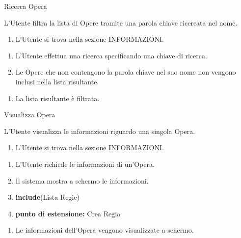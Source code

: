 {\ucExtTable	%
	{	%
		Ricerca Opera
		
	}{	%
		
	}{	%
		L'Utente filtra la lista di Opere tramite una parola chiave ricercata nel nome.
		
	}{	%
		\attori
	}{	%
		\begin{enumerate}
			\item L'Utente si trova nella sezione INFORMAZIONI.
		\end{enumerate}
		
	}{	%
		\begin{enumerate}
			\item L'Utente effettua una ricerca specificando una chiave di ricerca.
            \item Le Opere che non contengono la parola chiave nel suo nome non vengono inclusi nella lista risultante.
		\end{enumerate}
		
	}{	%
		\begin{enumerate}
			\item La lista risultante è filtrata.
		\end{enumerate}
} }


{\ucTable	%
	{	%
		Visualizza Opera
		
	}{	%
		
	}{	%
		L'Utente visualizza le informazioni riguardo una singola Opera.
		
	}{	%
		\attori
	}{	%
		\begin{enumerate}
			\item L'Utente si trova nella sezione INFORMAZIONI.
		\end{enumerate}
		
	}{	%
		\begin{enumerate}
			\item L'Utente richiede le informazioni di un'Opera.
            \item Il sistema mostra a schermo le informazioni.
            \item \textbf{include}(Lista Regie)
            \item[] \textbf{punto di estensione:} Crea Regia
		\end{enumerate}
		
	}{	%
		\begin{enumerate}
			\item Le informazioni dell'Opera vengono visualizzate a schermo.
		\end{enumerate}
		
	}{	%
} }


